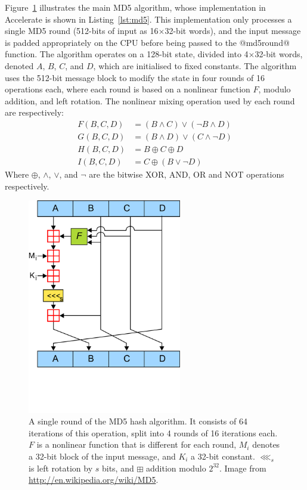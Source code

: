 Figure~\ref{fig:md5_round} illustrates the main MD5 algorithm, whose
implementation in Accelerate is shown in Listing~\ref{lst:md5}. This
implementation only processes a single MD5 round (512-bits of input as
16$\times$32-bit words), and the input message is padded appropriately on the
CPU before being passed to the @md5round@ function. The algorithm operates on a
128-bit state, divided into 4$\times$32-bit words, denoted $A$, $B$, $C$, and
$D$, which are initialised to fixed constants. The algorithm uses the 512-bit
message block to modify the state in four rounds of 16 operations each, where
each round is based on a nonlinear function $F$, modulo addition, and left
rotation. The nonlinear mixing operation used by each round are respectively:
%
\begin{align*}
    F(B,C,D) &= (B \wedge C) \vee (\neg B \wedge D) \\
    G(B,C,D) &= (B \wedge D) \vee (C \wedge \neg D) \\
    H(B,C,D) &= B \oplus C \oplus D \\
    I(B,C,D) &= C \oplus (B \vee \neg D)
\end{align*}
%
Where $\oplus$, $\wedge$, $\vee$, and $\neg$ are the bitwise XOR, AND, OR and
NOT operations respectively.

\begin{figure}
    \centering
    \includegraphics[width=0.6\textwidth]{images/sec-6/MD5/MD5}
    \caption[A single round of the MD5 hash algorithm]{A single round of the MD5
        hash algorithm. It consists of 64 iterations of this operation, split
        into 4 rounds of 16 iterations each. $F$ is a nonlinear function that is
        different for each round, $M_i$ denotes a 32-bit block of the input
        message, and $K_i$ a 32-bit constant. $\lll_s$ is left rotation by $s$
        bits, and $\boxplus$ addition modulo $2^{32}$. Image from
        \url{http://en.wikipedia.org/wiki/MD5}.}
    \label{fig:md5_round}
\end{figure}


